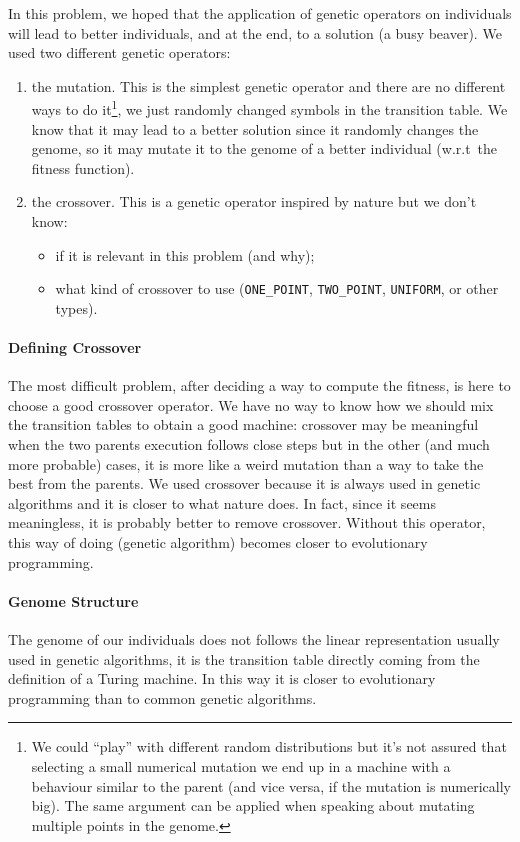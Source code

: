 In this problem, we hoped that the application of genetic operators on individuals will lead to better individuals, and at the end, to a solution (a busy beaver).
We used two different genetic operators:
\begin{enumerate}
\item the mutation. This is the simplest genetic operator and there are no different ways to do it\footnote{We could ``play'' with different random distributions but it's not assured that selecting a small numerical mutation we end up in a machine with a behaviour similar to the parent (and vice versa, if the mutation is numerically big). The same argument can be applied when speaking about mutating multiple points in the genome.}, we just randomly changed symbols in the transition table. We know that it may lead to a better solution since it randomly changes the genome, so it may mutate it to the genome of a better individual (w.r.t\ the fitness function).
\item the crossover. This is a genetic operator inspired by nature but we don't know:
  \begin{itemize}
  \item if it is relevant in this problem (and why);
  \item what kind of crossover to use (\texttt{ONE\_POINT}, \texttt{TWO\_POINT}, \texttt{UNIFORM}, or other types).
  \end{itemize}
\end{enumerate}

\paragraph{Defining Crossover}
The most difficult problem, after deciding a way to compute the fitness, is here to choose a good crossover operator. We have no way to know how we should mix the transition tables to obtain a good machine: crossover may be meaningful when the two parents execution follows close steps but in the other (and much more probable) cases, it is more like a weird mutation than a way to take the best from the parents.
We used crossover because it is always used in genetic algorithms and it is closer to what nature does. In fact, since it seems meaningless, it is probably better to remove crossover. 
Without this operator, this way of doing (genetic algorithm) becomes closer to evolutionary programming.

\paragraph{Genome Structure}
The genome of our individuals does not follows the linear representation usually used in genetic algorithms, it is the transition table directly coming from the definition of a Turing machine. In this way it is closer to evolutionary programming than to common genetic algorithms.

